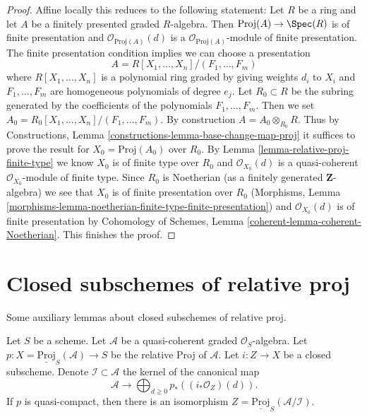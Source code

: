 \begin{proof}
Affine locally this reduces to the following statement:
Let $R$ be a ring and let $A$ be a finitely presented graded $R$-algebra.
Then $\text{Proj}(A) \to \Spec(R)$ is of finite presentation
and $\mathcal{O}_{\text{Proj}(A)}(d)$ is a
$\mathcal{O}_{\text{Proj}(A)}$-module of finite presentation.
The finite presentation condition implies we can choose
a presentation
$$
A = R[X_1, \ldots, X_n]/(F_1, \ldots, F_m)
$$
where $R[X_1, \ldots, X_n]$ is a polynomial ring graded by giving
weights $d_i$ to $X_i$ and $F_1, \ldots, F_m$ are homogeneous polynomials
of degree $e_j$. Let $R_0 \subset R$ be the subring generated by
the coefficients of the polynomials $F_1, \ldots, F_m$.
Then we set $A_0 = R_0[X_1, \ldots, X_n]/(F_1, \ldots, F_m)$.
By construction $A = A_0 \otimes_{R_0} R$.
Thus by
Constructions, Lemma \ref{constructions-lemma-base-change-map-proj}
it suffices to prove the result for $X_0 = \text{Proj}(A_0)$ over $R_0$.
By Lemma \ref{lemma-relative-proj-finite-type}
we know $X_0$ is of finite type over $R_0$ and
$\mathcal{O}_{X_0}(d)$ is a quasi-coherent $\mathcal{O}_{X_0}$-module
of finite type.
Since $R_0$ is Noetherian (as a finitely generated $\mathbf{Z}$-algebra)
we see that $X_0$ is of finite presentation over $R_0$
(Morphisms, Lemma
\ref{morphisms-lemma-noetherian-finite-type-finite-presentation})
and $\mathcal{O}_{X_0}(d)$ is of finite presentation by
Cohomology of Schemes, Lemma \ref{coherent-lemma-coherent-Noetherian}.
This finishes the proof.
\end{proof}










\section{Closed subschemes of relative proj}
\label{section-closed-in-relative-proj}

\noindent
Some auxiliary lemmas about closed subschemes of relative proj.

\begin{lemma}
\label{lemma-closed-subscheme-proj}
Let $S$ be a scheme. Let $\mathcal{A}$ be a quasi-coherent graded
$\mathcal{O}_S$-algebra. Let
$p : X = \underline{\text{Proj}}_S(\mathcal{A}) \to S$ be the relative
Proj of $\mathcal{A}$. Let $i : Z \to X$ be a closed subscheme. Denote
$\mathcal{I} \subset \mathcal{A}$ the kernel of the canonical map
$$
\mathcal{A}
\longrightarrow
\bigoplus\nolimits_{d \geq 0} p_*\left((i_*\mathcal{O}_Z)(d)\right).
$$
If $p$ is quasi-compact, then there is an isomorphism
$Z = \underline{\text{Proj}}_S(\mathcal{A}/\mathcal{I})$.
\end{lemma}

